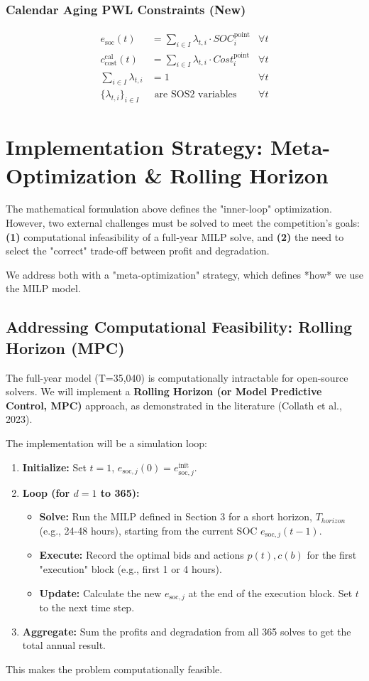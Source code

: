 \documentclass[11pt, a4paper]{article}
\begin{document}
\subsubsection{Calendar Aging PWL Constraints (New)}
\begin{align}
    e_{\mathrm{soc}}(t) &= \sum_{i \in I} \lambda_{t,i} \cdot SOC^{\mathrm{point}}_i & \forall t \\
    c^{\mathrm{cal}}_{\mathrm{cost}}(t) &= \sum_{i \in I} \lambda_{t,i} \cdot Cost^{\mathrm{point}}_i & \forall t \\
    \sum_{i \in I} \lambda_{t,i} &= 1 & \forall t \\
    \{\lambda_{t,i}\}_{i \in I} &\text{ are SOS2 variables} & \forall t
\end{align}

\section{Implementation Strategy: Meta-Optimization \& Rolling Horizon}
The mathematical formulation above defines the "inner-loop" optimization. However, two external challenges must be solved to meet the competition's goals: \textbf{(1)} computational infeasibility of a full-year MILP solve, and \textbf{(2)} the need to select the "correct" trade-off between profit and degradation.

We address both with a "meta-optimization" strategy, which defines *how* we use the MILP model.

\subsection{Addressing Computational Feasibility: Rolling Horizon (MPC)}
The full-year model (T=35,040) is computationally intractable for open-source solvers. We will implement a \textbf{Rolling Horizon (or Model Predictive Control, MPC)} approach, as demonstrated in the literature (Collath et al., 2023).

The implementation will be a simulation loop:
\begin{enumerate}
    \item \textbf{Initialize:} Set $t=1$, $e_{\mathrm{soc},j}(0) = e^{\mathrm{init}}_{\mathrm{soc},j}$.
    \item \textbf{Loop (for $d = 1$ to 365):}
    \begin{itemize}
        \item \textbf{Solve:} Run the MILP defined in Section 3 for a short horizon, $T_{horizon}$ (e.g., 24-48 hours), starting from the current SOC $e_{\mathrm{soc},j}(t-1)$.
        \item \textbf{Execute:} Record the optimal bids and actions $p(t), c(b)$ for the first "execution" block (e.g., first 1 or 4 hours).
        \item \textbf{Update:} Calculate the new $e_{\mathrm{soc},j}$ at the end of the execution block. Set $t$ to the next time step.
    \end{itemize}
    \item \textbf{Aggregate:} Sum the profits and degradation from all 365 solves to get the total annual result.
\end{enumerate}
This makes the problem computationally feasible.
\end{document}
